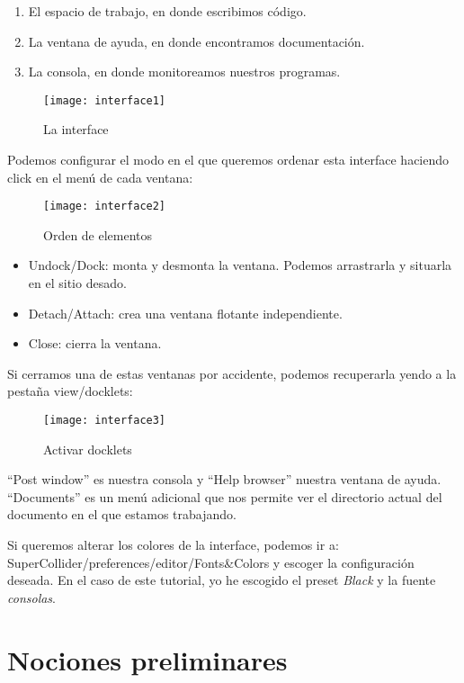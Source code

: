 \begin{enumerate}
	\item El espacio de trabajo, en donde escribimos código.
	\item La ventana de ayuda, en donde encontramos documentación.
	\item La consola, en donde monitoreamos nuestros programas. 
\end{enumerate}

\begin{figure}[h]
\texttt{[image: interface1]}
\centering
\caption{La interface}
\label{fig:áreas}
\end{figure}

Podemos configurar el modo en el que queremos ordenar esta interface haciendo click en el menú de cada ventana:

\begin{figure}[h]
\texttt{[image: interface2]}
\centering
\caption{Orden de elementos}
\label{fig:orden}
\end{figure} 

\begin{itemize}
	\item Undock/Dock: monta y desmonta la ventana. Podemos arrastrarla y situarla en el sitio desado.
	\item Detach/Attach: crea una ventana flotante independiente.
	\item Close: cierra la ventana.
	\label{fig:docklets}
\end{itemize}

Si cerramos una de estas ventanas por accidente, podemos recuperarla yendo a la pestaña view/docklets:

\begin{figure}[h]
\texttt{[image: interface3]}
\centering
\caption{Activar docklets}
\label{fig:activar}
\end{figure} 

``Post window'' es nuestra consola y ``Help browser'' nuestra ventana de ayuda. ``Documents'' es un menú adicional que nos permite ver el directorio actual del documento en el que estamos trabajando.

Si queremos alterar los colores de la interface, podemos ir a: \\
SuperCollider/preferences/editor/Fonts\&Colors y escoger la configuración deseada. En el caso de este tutorial, yo he escogido el preset \textit{Black} y la fuente \textit{consolas}.

\section{Nociones preliminares}


